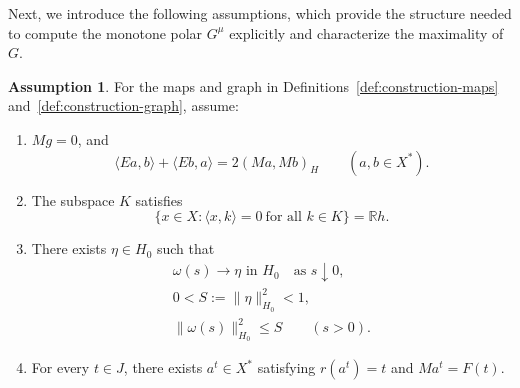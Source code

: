 \documentclass[11pt]{article}
\newcommand{\R}{\mathbb R}
\newcommand{\pair}[2]{\langle #1,#2\rangle}
\theoremstyle{definition}
\newtheorem{assumption}{Assumption}
\theoremstyle{remark}
\begin{document}
Next, we introduce the following assumptions, which provide the structure needed to compute the monotone polar $G^\mu$ explicitly and characterize the maximality of $G$. 



\begin{assumption}\label{ass:construction}
For the maps and graph in Definitions~\ref{def:construction-maps} and~\ref{def:construction-graph}, assume:
\begin{enumerate}
\renewcommand{\theenumi}{H\arabic{enumi}}
\renewcommand{\labelenumi}{(\theenumi)}
\item\label{ass:bilinear} $Mg=0$, and
\begin{equation}
\pair{Ea}{b}+\pair{Eb}{a}=2(Ma,Mb)_H
\qquad(a,b\in X^*).
\label{eq:abs-bilinear}
\end{equation}

\item\label{ass:annihilator} The subspace $K$ satisfies
\begin{equation}
\{x\in X:\pair{x}{k}=0\ \text{for all }k\in K\}=\R h.
\label{eq:abs-annihilator}
\end{equation}

\item\label{ass:curve-limit} There exists $\eta\in H_0$ such that
\begin{equation}
\begin{gathered}
\omega(s)\longrightarrow\eta\text{ in }H_0
\quad\text{as }s\downarrow0,\\
0<S:=\|\eta\|_{H_0}^2<1,\\
\|\omega(s)\|_{H_0}^2\le S\qquad(s>0).
\end{gathered}
\label{eq:abs-tail}
\end{equation}

\item\label{ass:realization} For every $t\in J$, there exists $a^t\in X^*$
satisfying $r(a^t)=t$ and $Ma^t=F(t)$.
\end{enumerate}
\end{assumption}
\end{document}
